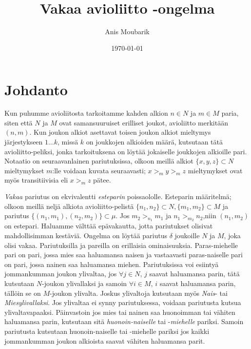 \documentclass[finnish]{tktltiki2}
\title{Vakaa avioliitto -ongelma}
\author{Anis Moubarik}
\date{\today}
\theoremstyle{definition}
\theoremstyle{remark}
\begin{document}

\maketitle        %
\makeabstract     %

\tableofcontents  %
\newpage          %



\section{Johdanto}
Kun puhumme avioliitosta tarkoitamme kahden alkion $n \in N$ ja $m \in M$ paria, siten että $N$ ja $M$ ovat samansuuruiset erilliset joukot, avioliitto merkitään $(n, m)$.
Kun joukon alkiot asettavat toisen joukon alkiot mieltymys järjestykseen $1 \ldots k$, missä $k$ on joukkojen alkioiden määrä, kutsutaan tätä avioliitto-peliksi, jonka tarkoituksena on löytää jokaiselle joukkojen alkioille pari. Notaatio on seuraavanlainen pariutuksissa, olkoon meillä alkiot $\{x, y, z\} \subset N$ mieltymykset $m$:lle voidaan kuvata seuraavasti; $x >_m y >_m z$ mieltymykset ovat myös transitiivisia eli $x >_m z$ pätee.

\emph{Vakaa} pariutus on ekvivalentti \emph{esteparin} poissaololle. Esteparin määritelmä; olkoon meillä neljä alkiota avioliitto-pelistä $\{n_1, n_2\} \subset N, \{m_1, m_2\} \subset M$ ja pariutus $\{(n_1, m_1), (n_2, m_2)\} \subset \mu$. Jos $m_2 >_{n_1} m_1$ ja $n_1 >_{m_2} n_2$,niin $(n_1, m_2)$ on estepari. Haluamme välttää epävakautta, jotta pariutukset olisivat mahdollisimman kestäviä. Ongelma on löytää pariutus $\delta$ joukoille $N$ ja $M$, joka olisi vakaa.
Pariutuksilla ja pareilla on erillaisia ominaisuuksia. Paras-miehelle pari on pari, jossa mies saa haluamansa naisen ja vastaavasti paras-naiselle pari on pari, jossa nainen saa haluamansa miehen. Pariutuksissa voi esiintyä jommankumman joukon ylivaltaa, jos $\forall j \in N$, $j$ saavat haluamansa parin, tätä kutsutaan $N$-joukon ylivallaksi ja samoin $\forall i \in M$, $i$ saavat haluamansa parin, tällöin se on $M$-joukon ylivalta. Joskus ylivaltoja kutsutaan myös \emph{Nais}- tai \emph{Miesylivallaksi}. Jos ylivaltaa ei synny pariutuksessa, voidaan pariutusta kutsua ylivaltavapaaksi.
Päinvastoin jos mies tai nainen saa huonoimman tai vähiten haluamansa parin, kutsutaan sitä \emph{huonoin-naiselle} tai -\emph{miehelle} pariksi. Samoin pariutusta kutsutaan huonoin-naiselle tai -miehelle pariksi jos kaikki jommankumman joukon alkioista saavat vähiten haluamansa parit.
\end{document}
